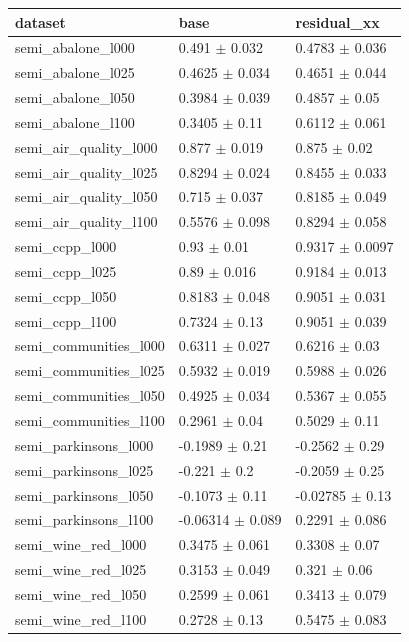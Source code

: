 \begin{tabular}{lll}
\toprule
dataset & base & residual\_xx \\
\midrule
semi\_abalone\_l000 & 0.491 $\pm$ 0.032 & 0.4783 $\pm$ 0.036 \\
semi\_abalone\_l025 & 0.4625 $\pm$ 0.034 & 0.4651 $\pm$ 0.044 \\
semi\_abalone\_l050 & 0.3984 $\pm$ 0.039 & 0.4857 $\pm$ 0.05 \\
semi\_abalone\_l100 & 0.3405 $\pm$ 0.11 & 0.6112 $\pm$ 0.061 \\
semi\_air\_quality\_l000 & 0.877 $\pm$ 0.019 & 0.875 $\pm$ 0.02 \\
semi\_air\_quality\_l025 & 0.8294 $\pm$ 0.024 & 0.8455 $\pm$ 0.033 \\
semi\_air\_quality\_l050 & 0.715 $\pm$ 0.037 & 0.8185 $\pm$ 0.049 \\
semi\_air\_quality\_l100 & 0.5576 $\pm$ 0.098 & 0.8294 $\pm$ 0.058 \\
semi\_ccpp\_l000 & 0.93 $\pm$ 0.01 & 0.9317 $\pm$ 0.0097 \\
semi\_ccpp\_l025 & 0.89 $\pm$ 0.016 & 0.9184 $\pm$ 0.013 \\
semi\_ccpp\_l050 & 0.8183 $\pm$ 0.048 & 0.9051 $\pm$ 0.031 \\
semi\_ccpp\_l100 & 0.7324 $\pm$ 0.13 & 0.9051 $\pm$ 0.039 \\
semi\_communities\_l000 & 0.6311 $\pm$ 0.027 & 0.6216 $\pm$ 0.03 \\
semi\_communities\_l025 & 0.5932 $\pm$ 0.019 & 0.5988 $\pm$ 0.026 \\
semi\_communities\_l050 & 0.4925 $\pm$ 0.034 & 0.5367 $\pm$ 0.055 \\
semi\_communities\_l100 & 0.2961 $\pm$ 0.04 & 0.5029 $\pm$ 0.11 \\
semi\_parkinsons\_l000 & -0.1989 $\pm$ 0.21 & -0.2562 $\pm$ 0.29 \\
semi\_parkinsons\_l025 & -0.221 $\pm$ 0.2 & -0.2059 $\pm$ 0.25 \\
semi\_parkinsons\_l050 & -0.1073 $\pm$ 0.11 & -0.02785 $\pm$ 0.13 \\
semi\_parkinsons\_l100 & -0.06314 $\pm$ 0.089 & 0.2291 $\pm$ 0.086 \\
semi\_wine\_red\_l000 & 0.3475 $\pm$ 0.061 & 0.3308 $\pm$ 0.07 \\
semi\_wine\_red\_l025 & 0.3153 $\pm$ 0.049 & 0.321 $\pm$ 0.06 \\
semi\_wine\_red\_l050 & 0.2599 $\pm$ 0.061 & 0.3413 $\pm$ 0.079 \\
semi\_wine\_red\_l100 & 0.2728 $\pm$ 0.13 & 0.5475 $\pm$ 0.083 \\
\bottomrule
\end{tabular}
